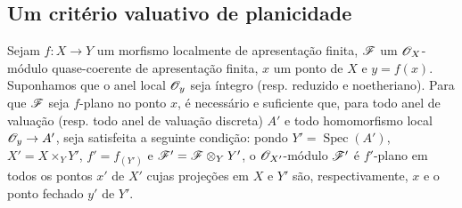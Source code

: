\subsection{Um critério valuativo de planicidade}
\label{subsection:IV.11.8}

\begin{theorem}[11.8.1]
\label{IV.11.8.1}
Sejam $f:X\to Y$ um morfismo
localmente de apresentação
finita, $\mathscr{F}$ um
$\mathscr{O}_X$-módulo
quase-coerente de apresentação
finita, $x$ um ponto de $X$
e $y=f(x)$. Suponhamos que
o anel local $\mathscr{O}_y$ seja
íntegro (resp. reduzido e
noetheriano). Para que
$\mathscr{F}$ seja $f$-plano no
ponto $x$, é necessário e
suficiente que, para todo
anel de valuação (resp.
todo anel de valuação
discreta) $A'$ e todo
homomorfismo local
$\sh{O}_y\to A'$, seja
satisfeita a seguinte
condição: pondo
$Y'=\operatorname{Spec}(A')$,
$X'=X\times_Y Y'$,
$f'=f_{(Y')}$ e
$\mathscr{F}'=\mathscr{F}\otimes_Y Y'$,
o $\mathscr{O}_{X'}$-módulo
$\mathscr{F}'$ é $f'$-plano em
todos os pontos $x'$ de
$X'$ cujas projeções em
$X$ e $Y'$ são,
respectivamente, $x$ e o
ponto fechado $y'$ de $Y'$.
\end{theorem}

